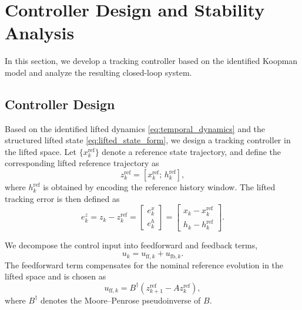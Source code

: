 \section{Controller Design and Stability Analysis}
\label{sec:control}

In this section, we develop a tracking controller based on the identified Koopman model and analyze the resulting closed-loop system.

\subsection{Controller Design}
\label{subsec:controller_design}

Based on the identified lifted dynamics \eqref{eq:temporal_dynamics} and the structured lifted state \eqref{eq:lifted_state_form}, we design a tracking controller in the lifted space. Let $\{x_k^{\mathrm{ref}}\}$ denote a reference state trajectory, and define the corresponding lifted reference trajectory as
\begin{equation}
    z_k^{\mathrm{ref}} = [x_k^{\mathrm{ref}};\,h_k^{\mathrm{ref}}],
    \label{eq:lifted_reference}
\end{equation}
where $h_k^{\mathrm{ref}}$ is obtained by encoding the reference history window. The lifted tracking error is then defined as
\begin{equation}
    e_k^z = z_k - z_k^{\mathrm{ref}}
    =
    \begin{bmatrix}
        e_k^x \\ e_k^h
    \end{bmatrix}
    =
    \begin{bmatrix}
        x_k - x_k^{\mathrm{ref}} \\
        h_k - h_k^{\mathrm{ref}}
    \end{bmatrix}.
    \label{eq:structured_error}
\end{equation}

We decompose the control input into feedforward and feedback terms,
\begin{equation}
    u_k = u_{\mathrm{ff},k} + u_{\mathrm{fb},k}.
    \label{eq:control_decomposition}
\end{equation}
The feedforward term compensates for the nominal reference evolution in the lifted space and is chosen as
\begin{equation}
    u_{\mathrm{ff},k}
    =
    B^\dagger \!\left(z_{k+1}^{\mathrm{ref}} - A z_k^{\mathrm{ref}}\right),
    \label{eq:feedforward}
\end{equation}
where $B^\dagger$ denotes the Moore--Penrose pseudoinverse of $B$.

